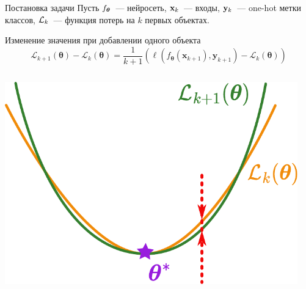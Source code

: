 \documentclass[aspectratio=169]{beamer}
\begin{document}
\begin{frame}{Постановка задачи}
    Пусть $f_{\boldsymbol{\theta}}$~--- нейросеть, $\mathbf{x}_k$~--- входы, $\mathbf{y}_{k}$~--- one-hot метки классов, $\mathcal{L}_k$~--- функция потерь на $k$ первых объектах.
    \vspace{-0.75em}
    \begin{block}{Изменение значения при добавлении одного объекта}
    \vspace{-0.5em}
        \begin{equation*}
            \mathcal{L}_{k+1}(\boldsymbol{\theta}) - \mathcal{L}_k(\boldsymbol{\theta}) = \dfrac{1}{k+1} \left( \ell(f_{\boldsymbol{\theta}}(\mathbf{x}_{k+1}), \mathbf{y}_{k+1}) - \mathcal{L}_{k}(\boldsymbol{\theta}) \right)
        \end{equation*}
    \end{block}

    \begin{columns}
        \begin{column}{0.4\textwidth}
            \vspace{1em}
            \includegraphics[width=0.95\textwidth]{slides/loss-diff.pdf}    
        \end{column}


\end{columns}
\end{frame}
\end{document}
